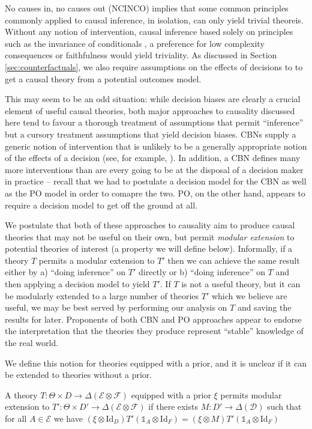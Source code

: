 No causes in, no causes out (NCINCO) implies that some common principles commonly applied to causal inference, in isolation, can only yield trivial theoreis. Without any notion of intervention, causal inference based solely on principles such as the invariance of conditionals \citet{arjovsky_invariant_2019,peters_causal_2016}, a preference for low complexity consequences \citet{lemeire_replacing_2013} or faithfulness \citet{spirtes_causation_1993} would yield triviality. As discussed in Section \ref{sec:counterfactuals}, we also require assumptions on the effects of decisions to to get a causal theory from a potential outcomes model.

This may seem to be an odd situation: while decision biases are clearly a crucial element of useful causal theories, both major approaches to causality discussed here tend to favour a thorough treatment of assumptions that permit ``inference'' but a cursory treatment assumptions that yield decision biases. CBNs supply a generic notion of intervention that is unlikely to be a generally appropriate notion of the effects of a decision (see, for example, \cite{hernan_does_2008}). In addition, a CBN defines many more interventions than are every going to be at the disposal of a decision maker in practice -- recall that we had to postulate a decision model for the CBN as well as the PO model in order to comapre the two. PO, on the other hand, appears to require a decision model to get off the ground at all. 

We postulate that both of these approaches to causality aim to produce causal theories that may not be useful on their own, but permit \emph{modular extension} to potential theories of interest (a property we will define below). Informally, if a theory $T$ permits a modular extension to $T'$ then we can achieve the same result either by a) ``doing inference'' on $T'$ directly or b) ``doing inference'' on $T$ and then applying a decision model to yield $T'$. If $T$ is not a useful theory, but it can be modularly extended to a large number of theories $T'$ which we believe are useful, we may be best served by performing our analysis on $T$ and saving the results for later. Proponents of both CBN and PO approaches appear to endorse the interpretation that the theories they produce represent ``stable'' knowledge of the real world.

We define this notion for theories equipped with a prior, and it is unclear if it can be extended to theories without a prior.

\begin{definition}
A theory $T:\Theta\times D\to \Delta(\mathcal{E}\otimes\mathcal{F})$ equipped with a prior $\xi$ permits modular extension to $T':\Theta\times D'\to \Delta(\mathcal{E}\otimes\mathcal{F})$ if there exists $M:D'\to \Delta(\mathcal{D})$ such that for all $A\in \mathcal{E}$ we have 
$(\xi \otimes \mathrm{Id}_D) T' (\mathds{1}_A \otimes \mathrm{Id}_F) = (\xi \otimes M) T' (\mathds{1}_A \otimes \mathrm{Id}_F)$
\end{definition}

